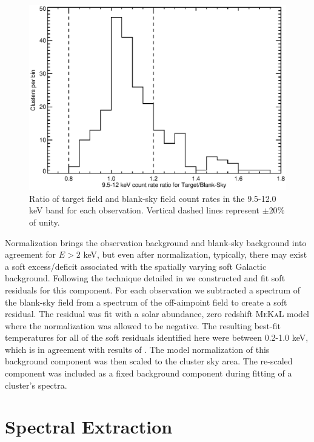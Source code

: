 \documentclass[12pt,preprint]{aastex}
\begin{document}
\clearpage
\begin{figure}
\begin{center}
\includegraphics*[width=\textwidth, trim=5mm 0mm 0mm 0mm, clip]{f2.eps}
\caption{
Ratio of target field and blank-sky field count rates in the 9.5-12.0
keV band for each observation. Vertical dashed lines represent $\pm
20\%$ of unity.
}
\label{fig:bgd}
\end{center}
\end{figure}
\clearpage

Normalization brings the observation background and blank-sky
background into agreement for $E > 2$ keV, but even after
normalization, typically, there may exist a soft excess/deficit
associated with the spatially varying soft Galactic
background. Following the technique detailed in
\cite{2005ApJ...628..655V} we constructed and fit soft residuals for
this component. For each observation we subtracted a spectrum of the
blank-sky field from a spectrum of the off-aimpoint field to create a
soft residual. The residual was fit with a solar abundance, zero
redshift {\textsc{MeKaL}} model \citep{1985A&AS...62..197M,
1986A&AS...65..511M, 1992SRON, 1995ApJ...438L.115L} where the
normalization was allowed to be negative. The resulting best-fit
temperatures for all of the soft residuals identified here were
between 0.2-1.0 keV, which is in agreement with results of
\cite{2005ApJ...628..655V}. The model normalization of this background
component was then scaled to the cluster sky area. The re-scaled
component was included as a fixed background component during fitting
of a cluster's spectra.

\section{Spectral Extraction} \label{sec:extraction}
\end{document}
